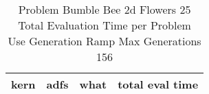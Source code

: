 \begin{table}[H]
\caption{Problem  Bumble Bee 2d  Flowers 25\\Total Evaluation Time per Problem \\ Use Generation Ramp  Max Generations 156\\}
\begin{center}
\scalebox{1.0} %
{
\begin{tabular}{lllr}
\hline
kern & adfs & what & total eval time \\
\hline


\end{tabular}
}
\end{center}
\end{table}

